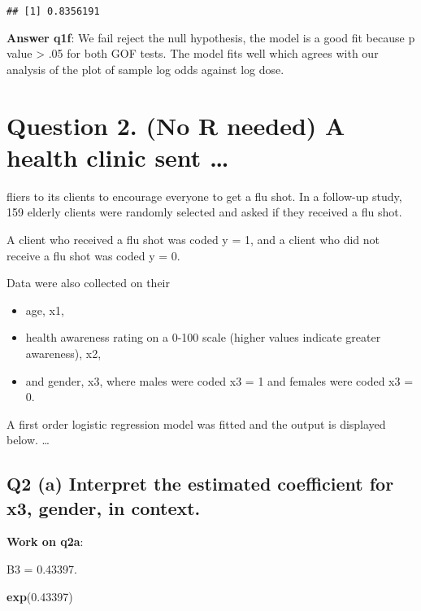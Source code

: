 \documentclass[
]{article}
\newenvironment{Shaded}{\begin{snugshade}}{\end{snugshade}}
\newcommand{\FloatTok}[1]{\textcolor[rgb]{0.00,0.00,0.81}{#1}}
\newcommand{\KeywordTok}[1]{\textcolor[rgb]{0.13,0.29,0.53}{\textbf{#1}}}
\newcommand{\NormalTok}[1]{#1}
\providecommand{\tightlist}{%
  \setlength{\itemsep}{0pt}\setlength{\parskip}{0pt}}
\begin{document}
\begin{verbatim}
## [1] 0.8356191
\end{verbatim}

\textbf{Answer q1f}: We fail reject the null hypothesis, the model is a
good fit because p value \textgreater{} .05 for both GOF tests. The
model fits well which agrees with our analysis of the plot of sample log
odds against log dose.

\hypertarget{question-2.-no-r-needed-a-health-clinic-sent}{%
\section{Question 2. (No R needed) A health clinic sent
\ldots{}}\label{question-2.-no-r-needed-a-health-clinic-sent}}

fliers to its clients to encourage everyone to get a flu shot. In a
follow-up study, 159 elderly clients were randomly selected and asked if
they received a flu shot.

A client who received a flu shot was coded y = 1, and a client who did
not receive a flu shot was coded y = 0.

Data were also collected on their

\begin{itemize}
\tightlist
\item
  age, x1,
\item
  health awareness rating on a 0-100 scale (higher values indicate
  greater awareness), x2,
\item
  and gender, x3, where males were coded x3 = 1 and females were coded
  x3 = 0.
\end{itemize}

A first order logistic regression model was fitted and the output is
displayed below. \ldots{}

\hypertarget{q2-a-interpret-the-estimated-coefficient-for-x3-gender-in-context.}{%
\subsection{Q2 (a) Interpret the estimated coefficient for x3, gender,
in
context.}\label{q2-a-interpret-the-estimated-coefficient-for-x3-gender-in-context.}}

\textbf{Work on q2a}:

B3 = 0.43397.

\begin{Shaded}
\begin{Highlighting}[]
\KeywordTok{exp}\NormalTok{(}\FloatTok{0.43397}\NormalTok{)}
\end{Highlighting}
\end{Shaded}
\end{document}
